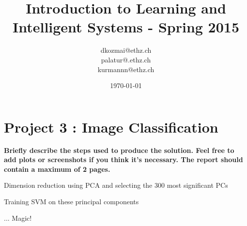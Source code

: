 \documentclass[a4paper, 11pt]{article}
\title{Introduction to Learning and Intelligent Systems - Spring 2015}
\author{dkozmai@ethz.ch\\ palatur@.ethz.ch\\ kurmannn@ethz.ch\\}
\date{\today}
\begin{document}
\maketitle

\section*{Project 3 : Image Classification}

\textbf{Briefly describe the steps used to produce the solution. Feel
free to add plots or screenshots if you think it's necessary. The
report should contain a maximum of 2 pages.
}

Dimension reduction using PCA and selecting the 300 most significant PCs

Training SVM on these principal components

... Magic!
\end{document}
